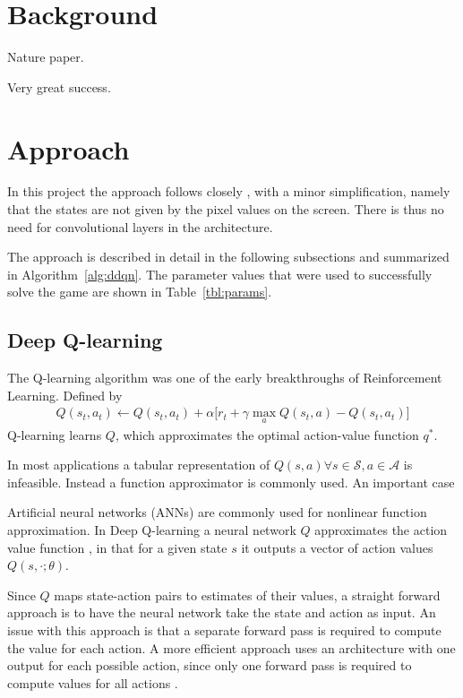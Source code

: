 \documentclass{article}
\begin{document}
\section{Background}
\label{background}

Nature paper. \cite{mnih2015humanlevel}

Very great success.

\section{Approach}
\label{approach}
In this project the approach follows closely \cite{Mnih2013PlayingAW}, with a minor simplification, namely that the states are not given by the pixel values on the screen. There is thus no need for convolutional layers in the architecture.

The approach is described in detail in the following subsections and summarized in Algorithm~\ref{alg:ddqn}. The parameter values that were used to successfully solve the game are shown in Table~\ref{tbl:params}.

\subsection{Deep Q-learning}
The Q-learning algorithm \cite{watkins} was one of the early breakthroughs of Reinforcement Learning. Defined by
\begin{align}
  \label{eq:Qlearning}
  Q(s_t, a_t) \gets Q(s_t, a_t) + \alpha \Big[ r_t + \gamma \max_a Q(s_t, a) - Q(s_t, a_t)\Big]
\end{align}
Q-learning learns $Q$, which approximates the optimal action-value function $q^*$.

In most applications a tabular representation of $Q(s,a) \forall s \in \mathcal{S}, a \in \mathcal{A}$ is infeasible. Instead a function approximator is commonly used. An important case

Artificial neural networks (ANNs) are commonly used for nonlinear function approximation. In Deep Q-learning a neural network $Q$ approximates the action value function \cite{Sutton1998}, in that for a given state $s$ it outputs a vector of action values $Q(s,\cdot; \theta)$.

Since $Q$ maps state-action pairs to estimates of their values, a straight forward approach is to have the neural network take the state and action as input. An issue with this approach is that a separate forward pass is required to compute the value for each action. A more efficient approach uses an architecture with one output for each possible action, since only one forward pass is required to compute values for all actions \cite{mnih2015humanlevel}.
\end{document}
